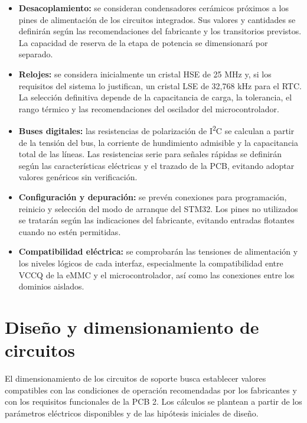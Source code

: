 \documentclass[11pt,a4paper]{article}
\begin{document}
\begin{itemize}
    \item \textbf{Desacoplamiento:} se consideran condensadores
    cerámicos próximos a los pines de alimentación de los circuitos
    integrados. Sus valores y cantidades se definirán según las
    recomendaciones del fabricante y los transitorios previstos.
    La capacidad de reserva de la etapa de potencia se dimensionará
    por separado.

    \item \textbf{Relojes:} se considera inicialmente un cristal HSE
    de 25 MHz y, si los requisitos del sistema lo justifican, un
    cristal LSE de 32,768 kHz para el RTC. La selección definitiva
    depende de la capacitancia de carga, la tolerancia, el rango
    térmico y las recomendaciones del oscilador del microcontrolador.

    \item \textbf{Buses digitales:} las resistencias de polarización
    de I\textsuperscript{2}C se calculan a partir de la tensión del
    bus, la corriente de hundimiento admisible y la capacitancia total
    de las líneas. Las resistencias serie para señales rápidas se
    definirán según las características eléctricas y el trazado de
    la PCB, evitando adoptar valores genéricos sin verificación.

    \item \textbf{Configuración y depuración:} se prevén conexiones
    para programación, reinicio y selección del modo de arranque del
    STM32. Los pines no utilizados se tratarán según las indicaciones
    del fabricante, evitando entradas flotantes cuando no estén
    permitidas.

    \item \textbf{Compatibilidad eléctrica:} se comprobarán las
    tensiones de alimentación y los niveles lógicos de cada interfaz,
    especialmente la compatibilidad entre VCCQ de la eMMC y el
    microcontrolador, así como las conexiones entre los dominios
    aislados.
\end{itemize}


\section{Diseño y dimensionamiento de circuitos}

El dimensionamiento de los circuitos de soporte busca establecer
valores compatibles con las condiciones de operación recomendadas
por los fabricantes y con los requisitos funcionales de la PCB 2.
Los cálculos se plantean a partir de los parámetros eléctricos
disponibles y de las hipótesis iniciales de diseño.
\end{document}
